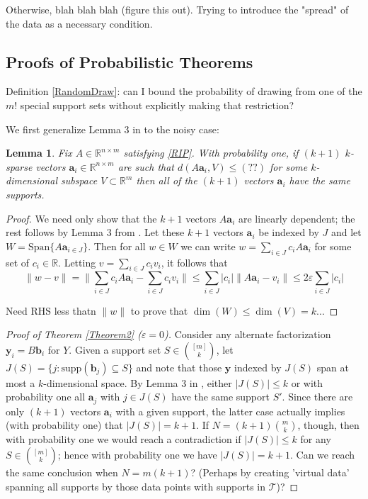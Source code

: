 \documentclass[journal, onecolumn]{IEEEtran}
\newtheorem{lemma}{Lemma}
\begin{document}
Otherwise, blah blah blah (figure this out). Trying to introduce the "spread" of the data as a necessary condition.


\subsection{Proofs of Probabilistic Theorems}\label{PUTproof}

Definition \ref{RandomDraw}: can I bound the probability of drawing from one of the $m!$ special support sets without explicitly making that restriction?

We first generalize Lemma 3 in \cite{HS11} to the noisy case:

\begin{lemma}
Fix $A \in \mathbb{R}^{n \times m}$ satisfying \eqref{RIP}. With probability one, if $(k+1)$ $k$-sparse vectors $\mathbf{a}_i \in \mathbb{R}^{n \times m}$ are such that $d(A\mathbf{a}_i,V) \leq (??)$ for some $k$-dimensional subspace $V \subset \mathbb{R}^m$ then all of the $(k+1)$ vectors $\mathbf{a}_i$ have the same supports.
\end{lemma}
\begin{proof}
We need only show that the $k+1$ vectors $A\mathbf{a}_i$ are linearly dependent; the rest follows by Lemma 3 from \cite{HS11}. Let these $k+1$ vectors $\mathbf{a}_i$ be indexed by $J$ and let $W = \text{Span}\{A\mathbf{a}_{i \in J}\}$. Then for all $w \in W$ we can write $w = \sum_{i \in J} c_iA\mathbf{a}_i$ for some set of $c_i \in \mathbb{R}$. Letting $v = \sum_{i \in J} c_iv_i$, it follows that
\[ \|w - v\| = \|\sum_{i \in J} c_i A\mathbf{a}_i - \sum_{i \in J} c_i v_i \| 
\leq \sum_{i \in J} |c_i| \|A\mathbf{a}_i - v_i\| \leq 2\varepsilon \sum_{i \in J}|c_i| \]

Need RHS less thatn $\|w\|$ to prove that $\dim(W) \leq \dim(V) = k$...
\end{proof}

\begin{proof}[Proof of Theorem \ref{Theorem2} ($\varepsilon = 0$)]
Consider any alternate factorization $\mathbf{y}_i = B\mathbf{b}_i$ for $Y$. Given a support set $S \in {[m]\choose k}$, let $J(S) = \{j: \text{supp}(\mathbf{b}_j) \subseteq S\}$ and note that those $\mathbf{y}$ indexed by $J(S)$ span at most a $k$-dimensional space. By Lemma 3 in \cite{HS11}, either $|J(S)| \leq k$ or with probability one all $\mathbf{a}_j$ with $j \in J(S)$ have the same support $S'$. Since there are only $(k+1)$ vectors $\mathbf{a}_i$ with a given support, the latter case actually implies (with probability one) that $|J(S)| = k+1$. If $N=(k+1){m \choose k}$, though, then with probability one we would reach a contradiction if $|J(S)| \leq k$ for any $S \in {[m] \choose k}$; hence with probability one we have $|J(S)| = k+1$. Can we reach the same conclusion when $N = m(k+1)$? (Perhaps by creating 'virtual data' spanning all supports by those data points with supports in $\mathcal{T}$)?

\end{proof}
\end{document}

